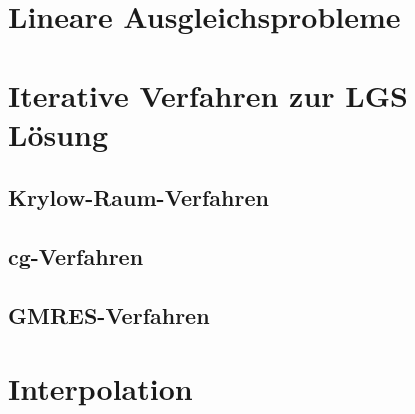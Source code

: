 \section*{Lineare Ausgleichsprobleme}

\section*{Iterative Verfahren zur LGS Lösung}

\subsection*{Krylow-Raum-Verfahren}

\subsection*{cg-Verfahren}

\subsection*{GMRES-Verfahren}

\section*{Interpolation}
